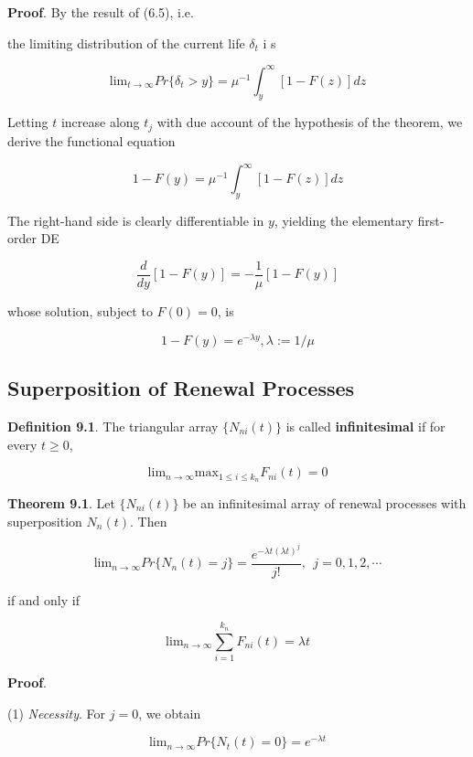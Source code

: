 \documentclass[12pt]{article}
\theoremstyle{nonumberbreak}
\begin{document}
\textbf{Proof}. By the result of (6.5), i.e. 


the limiting distribution of the current life $\delta_t$ i s

$$
\mathrm{lim}_{t\to\infty} Pr\{ \delta_t > y \} = \mu^{-1} \int_y^\infty [1 - F(z)] dz
$$


Letting $t$ increase along $t_j$ with due account of the hypothesis of the theorem, we derive the functional equation

$$
1 - F(y) = \mu^{-1} \int_y^\infty [1- F(z)] dz
$$

The right-hand side is clearly differentiable in $y$, yielding the elementary first-order DE

$$
\frac{d}{dy} [1 - F(y)] = - \frac{1}{\mu} [1-F(y)]
$$

whose solution, subject to $F(0) = 0$, is

$$
1 - F(y) = e^{-\lambda y}, \lambda := 1/\mu
$$







\subsection{Superposition of Renewal Processes}

\begin{theorem}
\textbf{Definition 9.1}. The triangular array $\{ N_{ni}(t) \}$ is called \textbf{infinitesimal} if for every $t \ge 0$,

$$
\mathrm{lim}_{n \to \infty} \mathrm{max}_{1 \le i \le k_n} F_{ni} (t) = 0
$$
\end{theorem}



\begin{theorem}
\textbf{Theorem 9.1}. Let $\{ N_{ni}(t) \}$ be an infinitesimal array of renewal processes with superposition $N_n(t)$. Then

$$
\mathrm{lim}_{n\to\infty} Pr \{ N_n(t) = j \} = \frac{e^{-\lambda t (\lambda t)^j}}{j!}, \ \ j=0,1,2,\cdots
$$

if and only if

$$
\mathrm{lim}_{n\to\infty} \sum_{i=1}^{k_n} F_{ni}(t) = \lambda t
$$

\end{theorem}

\textbf{Proof}. 

(1) \textit{Necessity}. For $j=0$, we obtain 

$$
\mathrm{lim}_{n\to \infty} Pr \{ N_t(t) = 0 \} = e^{-\lambda t}
$$
\end{document}
